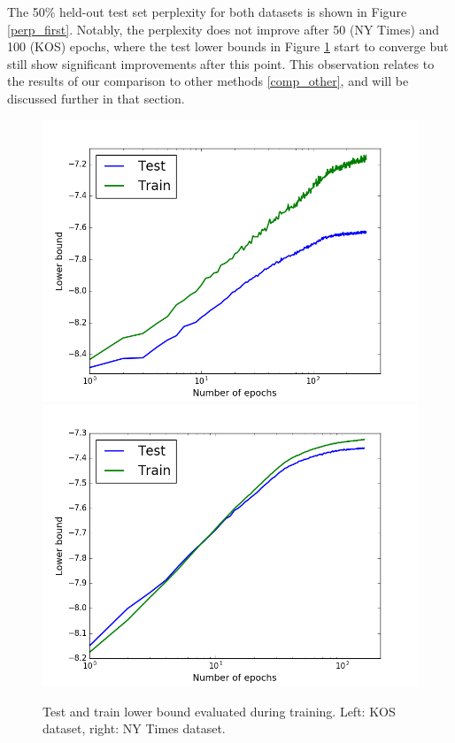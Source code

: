 \documentclass{report}
\begin{document}
	The 50\% held-out test set perplexity for both datasets is shown in Figure \ref{perp_first}. Notably, the perplexity does not improve after 50 (NY Times) and 100 (KOS) epochs, where the test lower bounds in Figure \ref{lb_first} start to converge but still show significant improvements after this point. This observation relates to the results of our comparison to other methods \ref{comp_other}, and will be discussed further in that section.
	
	\begin{figure}
		\includegraphics[scale = 0.40]{img/kos_400_0_lb.png}
		\includegraphics[scale = 0.40]{img/ny_400_50_lb.png}
		\caption{Test and train lower bound evaluated during training. Left: KOS dataset, right: NY Times dataset.}
		\label{lb_first}
	\end{figure}
	
\end{document}
